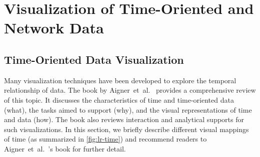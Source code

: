 \section{Visualization of Time-Oriented and Network Data}
\label{sub:lr-time-network}

\subsection{Time-Oriented Data Visualization}
Many visualization techniques have been developed to explore the temporal relationship of data. The book by Aigner~et~al.~\cite{Aigner2011} provides a comprehensive review of this topic. It discusses the characteristics of time and time-oriented data (what), the tasks aimed to support (why), and the visual representations of time and data (how). The book also reviews interaction and analytical supports for such visualizations. In this section, we briefly describe different visual mappings of time (as summarized in \autoref{fig:lr-time}) and recommend readers to Aigner~et~al.~'s book for further detail.

